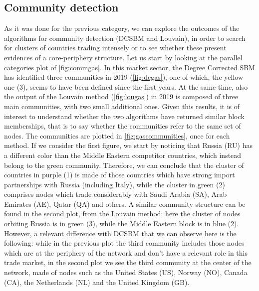 \subsection{Community detection}

As it was done for the previous category, we can explore the outcomes of the algorithms for community detection (DCSBM and Louvain), in order to search for clusters of countries trading intensely or to see whether these present evidences of a core-periphery structure. Let us start by looking at the parallel categories plot of \cref{fig:commgas}. In this market sector, the Degree Corrected SBM has identified three communities in 2019 (\cref{fig:dcgas}), one of which, the yellow one (3), seems to have been defined since the first years. At the same time, also the output of the Louvain method (\cref{fig:lougas}) in 2019 is composed of three main communities, with two small additional ones. Given this results, it is of interest to understand whether the two algorithms have returned similar block memberships, that is to say whether the communities refer to the same set of nodes. The communities are plotted in \cref{fig:gascommunities}, once for each method. If we consider the first figure, we start by noticing that Russia (RU) has a different color than the Middle Eastern competitor countries, which instead belong to the green community. Therefore, we can conclude that the cluster of countries in purple (1) is made of those countries which have strong import partnerships with Russia (including Italy), while the cluster in green (2) comprises nodes which trade considerably with Saudi Arabia (SA), Arab Emirates (AE), Qatar (QA) and others. A similar community structure can be found in the second plot, from the Louvain method: here the cluster of nodes orbiting Russia is in green (3), while the Middle Eastern block is in blue (2). However, a relevant difference with DCSBM that we can observe here is the following: while in the previous plot the third community includes those nodes which are at the periphery of the network and don't have a relevant role in this trade market, in the second plot we see the third community at the center of the network, made of nodes such as the United States (US), Norway (NO), Canada (CA), the Netherlands (NL) and the United Kingdom (GB).

